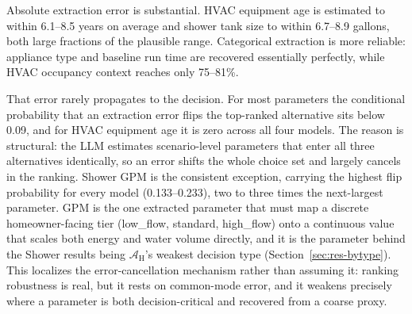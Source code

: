 \documentclass[final,3p,times]{elsarticle}
\begin{document}
Absolute extraction error is substantial. HVAC equipment age is estimated to within 6.1--8.5 years on average and shower tank size to within 6.7--8.9 gallons, both large fractions of the plausible range. Categorical extraction is more reliable: appliance type and baseline run time are recovered essentially perfectly, while HVAC occupancy context reaches only 75--81\%.

That error rarely propagates to the decision. For most parameters the conditional probability that an extraction error flips the top-ranked alternative sits below 0.09, and for HVAC equipment age it is zero across all four models. The reason is structural: the LLM estimates scenario-level parameters that enter all three alternatives identically, so an error shifts the whole choice set and largely cancels in the ranking. Shower GPM is the consistent exception, carrying the highest flip probability for every model (0.133--0.233), two to three times the next-largest parameter. GPM is the one extracted parameter that must map a discrete homeowner-facing tier (low\_flow, standard, high\_flow) onto a continuous value that scales both energy and water volume directly, and it is the parameter behind the Shower results being $\mathcal{A}_{\text{H}}$'s weakest decision type (Section~\ref{sec:res-bytype}). This localizes the error-cancellation mechanism rather than assuming it: ranking robustness is real, but it rests on common-mode error, and it weakens precisely where a parameter is both decision-critical and recovered from a coarse proxy.
\end{document}
